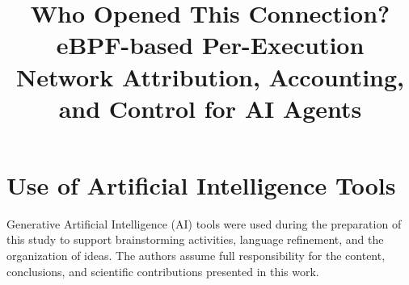 \documentclass[conference]{IEEEtran}
\newif\ifanon \anonfalse
\newcommand\1{\textit{(i)}}
\newcommand\2{\textit{(ii)}}
\newcommand\3{\textit{(iii)}}
\newcommand\4{\textit{(iv)}}
\newcommand\5{\textit{(v)}}
\newcommand\6{\textit{(vi)}}
\newcommand\7{\textit{(vii)}}
\newcommand\8{\textit{(viii)}}
\newcommand\9{\textit{(ix)}}
\begin{document}
\title{Who Opened This Connection? \\eBPF-based Per-Execution Network Attribution, Accounting, and Control for AI Agents}
\ifanon
\author{\IEEEauthorblockN{Anonymous Authors}}
\else
\author{
}
\fi
\maketitle











\section*{Use of Artificial Intelligence Tools}

Generative Artificial Intelligence (AI) tools were used during the preparation of this study to support brainstorming activities, language refinement, and the organization of ideas. The authors assume full responsibility for the content, conclusions, and scientific contributions presented in this work.



\end{document}
